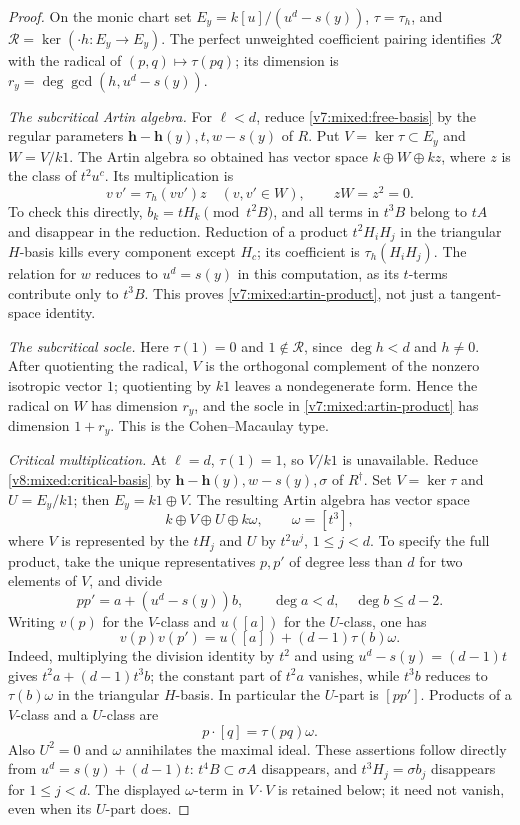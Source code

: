\documentclass[10pt,fleqn]{article}
\numberwithin{equation}{section}
\begin{document}
\begin{proof}
On the monic chart set $E_y=k[u]/(u^d-s(y))$, $\tau=\tau_h$, and
$\mathcal R=\ker(\cdot h:E_y\to E_y)$.
The perfect unweighted coefficient pairing identifies $\mathcal R$
with the radical of $(p,q)\mapsto\tau(pq)$; its dimension is
$r_y=\deg\gcd(h,u^d-s(y))$.

\textit{The subcritical Artin algebra.}
For $\ell<d$, reduce \eqref{v7:mixed:free-basis} by the regular
parameters $\mathbf h-\mathbf h(y),t,w-s(y)$ of $R$.
Put $V=\ker\tau\subset E_y$ and $W=V/k1$.
The Artin algebra so obtained has vector space $k\oplus W\oplus kz$,
where $z$ is the class of $t^2u^c$.  Its multiplication is
\begin{equation}\label{v7:mixed:artin-product}
 v\,v'=\tau_h(vv')z\quad(v,v'\in W),\qquad zW=z^2=0.
\end{equation}
To check this directly, $b_k=tH_k\pmod{t^2B}$, and all terms in
$t^3B$ belong to $tA$ and disappear in the reduction.  Reduction of a
product $t^2H_iH_j$ in the triangular $H$-basis kills every component
except $H_c$; its coefficient is $\tau_h(H_iH_j)$.
The relation for $w$ reduces to $u^d=s(y)$ in this computation, as its
$t$-terms contribute only to $t^3B$.  This proves
\eqref{v7:mixed:artin-product}, not just a tangent-space identity.

\textit{The subcritical socle.}
Here $\tau(1)=0$ and $1\notin\mathcal R$, since $\deg h<d$
and $h\ne0$.  After quotienting the radical, $V$ is the
orthogonal complement of the nonzero isotropic vector $1$; quotienting
by $k1$ leaves a nondegenerate form.  Hence the radical on $W$ has
dimension $r_y$, and the socle in \eqref{v7:mixed:artin-product} has
dimension $1+r_y$.  This is the Cohen--Macaulay type.

\textit{Critical multiplication.}
At $\ell=d$, $\tau(1)=1$, so $V/k1$ is unavailable.
Reduce \eqref{v8:mixed:critical-basis} by
$\mathbf h-\mathbf h(y),w-s(y),\sigma$ of $R^\dagger$.
Set $V=\ker\tau$ and $U=E_y/k1$; then $E_y=k1\oplus V$.
The resulting Artin algebra has vector space
\[
 k\oplus V\oplus U\oplus k\omega,
 \qquad \omega=[t^3],
\]
where $V$ is represented by the $tH_j$ and $U$ by $t^2u^j$,
$1\le j<d$.  To specify the full product, take the unique representatives
$p,p'$ of degree less than $d$ for two elements of $V$, and divide
\[
 pp'=a+(u^d-s(y))b,\qquad \deg a<d,\quad\deg b\le d-2.
\]
Writing $v(p)$ for the $V$-class and $u([a])$ for the $U$-class, one has
\[
 v(p)v(p')=u([a])+(d-1)\tau(b)\omega.
\]
Indeed, multiplying the division identity by $t^2$ and using
$u^d-s(y)=(d-1)t$ gives $t^2a+(d-1)t^3b$; the constant part of
$t^2a$ vanishes, while $t^3b$ reduces to $\tau(b)\omega$ in the
triangular $H$-basis.  In particular the $U$-part is $[pp']$.
Products of a $V$-class and a $U$-class are
\begin{equation}\label{v8:mixed:critical-cross-pairing}
 p\cdot[q]=\tau(pq)\omega.
\end{equation}
Also $U^2=0$ and $\omega$ annihilates the maximal ideal.
These assertions follow directly from $u^d=s(y)+(d-1)t$:
$t^4B\subset\sigma A$ disappears, and
$t^3H_j=\sigma b_j$ disappears for $1\le j<d$.
The displayed $\omega$-term in $V\cdot V$ is retained below;
it need not vanish, even when its $U$-part does.


\end{proof}
\end{document}
